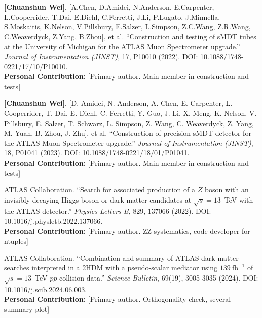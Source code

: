 
\begin{achievements}

  \begin{theachievements}[已发表论文]
    \item \textbf{[Chuanshun Wei]}, [A.Chen, D.Amidei, N.Anderson, E.Carpenter, L.Cooperrider, T.Dai, E.Diehl, C.Ferretti, J.Li, P.Lugato, J.Minnella, S.Moskaitis, K.Nelson, V.Pillsbury, E.Salzer, L.Simpson, Z.C.Wang, Z.R.Wang, C.Weaverdyck, Z.Yang, B.Zhou], et al. ``Construction and testing of sMDT tubes at the University of Michigan for the ATLAS Muon Spectrometer upgrade.'' \textit{Journal of Instrumentation (JINST)}, 17, P10010 (2022). DOI: 10.1088/1748-0221/17/10/P10010.
    \\ \textbf{Personal Contribution:} [Primary author. Main member in construction and tests]
    
    \item \textbf{[Chuanshun Wei]}, [D. Amidei, N. Anderson, A. Chen, E. Carpenter, L. Cooperrider, T. Dai, E. Diehl, C. Ferretti, Y. Guo, J. Li, X. Meng, K. Nelson, V. Pillsbury, E. Salzer, T. Schwarz, L. Simpson, Z. Wang, C. Weaverdyck, Z. Yang, M. Yuan, B. Zhou, J. Zhu], et al. ``Construction of precision sMDT detector for the ATLAS Muon Spectrometer upgrade.'' \textit{Journal of Instrumentation (JINST)}, 18, P01041 (2023). DOI: 10.1088/1748-0221/18/01/P01041.
    \\ \textbf{Personal Contribution:} [Primary author. Main member in construction and tests]
    
    \item ATLAS Collaboration. ``Search for associated production of a $Z$ boson with an invisibly decaying Higgs boson or dark matter candidates at $\sqrt{s}=13$~TeV with the ATLAS detector.'' \textit{Physics Letters B}, 829, 137066 (2022). DOI: 10.1016/j.physletb.2022.137066.
    \\ \textbf{Personal Contribution:} [Primary author. ZZ systematics, code developer for ntuples]
    
    \item ATLAS Collaboration. ``Combination and summary of ATLAS dark matter searches interpreted in a 2HDM with a pseudo-scalar mediator using $139~\text{fb}^{-1}$ of $\sqrt{s}=13$~TeV $pp$ collision data.'' \textit{Science Bulletin}, 69(19), 3005-3035 (2024). DOI: 10.1016/j.scib.2024.06.003.
    \\ \textbf{Personal Contribution:} [Primary author. Orthogonality check, several summary plot]
  \end{theachievements}


\end{achievements}
